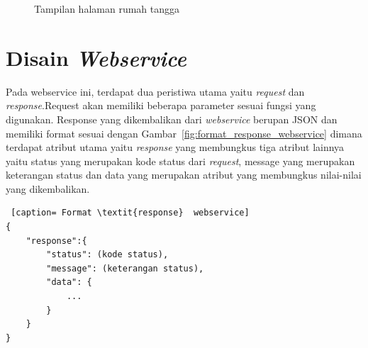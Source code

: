 \begin{figure}
\centering
{}
\caption[Tampilan halaman rumah tangga]{Tampilan halaman rumah tangga} 
\label{fig:design_web_index_rumah_tangga}
\end{figure}

\section{Disain \textit{Webservice}}

\hspace{0,5cm}Pada webservice ini, terdapat dua peristiwa utama yaitu \textit{request} dan \textit{response}.Request akan memiliki beberapa parameter sesuai fungsi yang digunakan. Response yang dikembalikan dari \textit{webservice} berupan JSON dan memiliki format sesuai dengan Gambar~\ref{fig:format_response_webservice} dimana terdapat atribut utama yaitu \textit{response} yang membungkus tiga atribut lainnya yaitu status yang merupakan kode status dari \textit{request}, message yang merupakan keterangan status dan data yang merupakan atribut yang membungkus nilai-nilai yang dikembalikan.

\begin{lstlisting} [caption= Format \textit{response}  webservice]
{
	"response":{
		"status": (kode status),
		"message": (keterangan status),
		"data": {
			...
		}
	}
}
\end{lstlisting}

